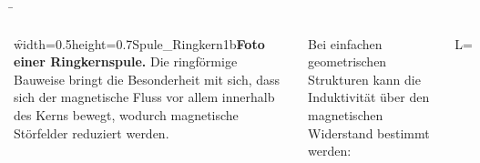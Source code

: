 \begin{frame} 
	\b{\begin{columns}
		\f{width=0.5\textwidth}{height=0.7\textheight}{Spule_Ringkern1b}{{\bf Foto einer Ringkernspule.} Die ringförmige Bauweise bringt die Besonderheit mit sich, dass sich der magnetische Fluss vor allem innerhalb des Kerns bewegt, wodurch magnetische Störfelder reduziert werden.}
	
	{\vspace{0pt}}%
	Bei einfachen geometrischen Strukturen kann die Induktivität über den magnetischen Widerstand bestimmt werden:
	{\vspace{1,5cm}}
	\begin{eq}
		L= \label{InduktivitaetFormel3}
	\end{eq}
	\end{columns}}
\end{frame}

